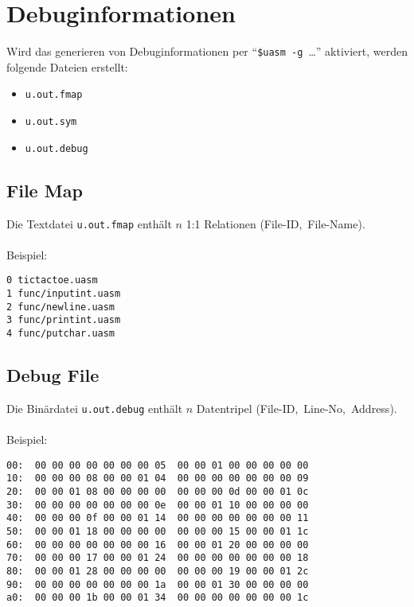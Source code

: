 \section{Debuginformationen}

\begin{frame}{\insertsection}
    Wird das generieren von Debuginformationen per ``\texttt{\$uasm~-g}~\ldots''
    aktiviert, werden folgende Dateien erstellt:
    \begin{itemize}
        \item \texttt{u.out.fmap}
        \item \texttt{u.out.sym}
        \item \texttt{u.out.debug}
    \end{itemize}
\end{frame}

\subsection{File Map}

\begin{frame}[fragile]{\insertsubsection}
    Die Textdatei \texttt{u.out.fmap} enthält $n$ 1:1 Relationen (File-ID,~File-Name).
    \\~\\
    Beispiel:
\begin{verbatim}
0 tictactoe.uasm
1 func/inputint.uasm
2 func/newline.uasm
3 func/printint.uasm
4 func/putchar.uasm
\end{verbatim}
\end{frame}

\subsection{Debug File}

\begin{frame}[fragile]{\insertsubsection}
    Die Binärdatei \texttt{u.out.debug} enthält $n$ Datentripel (File-ID,~Line-No,~Address).
    \\~\\
    Beispiel:
\begin{verbatim}
00:  00 00 00 00 00 00 00 05  00 00 01 00 00 00 00 00
10:  00 00 00 08 00 00 01 04  00 00 00 00 00 00 00 09
20:  00 00 01 08 00 00 00 00  00 00 00 0d 00 00 01 0c
30:  00 00 00 00 00 00 00 0e  00 00 01 10 00 00 00 00
40:  00 00 00 0f 00 00 01 14  00 00 00 00 00 00 00 11
50:  00 00 01 18 00 00 00 00  00 00 00 15 00 00 01 1c
60:  00 00 00 00 00 00 00 16  00 00 01 20 00 00 00 00
70:  00 00 00 17 00 00 01 24  00 00 00 00 00 00 00 18
80:  00 00 01 28 00 00 00 00  00 00 00 19 00 00 01 2c
90:  00 00 00 00 00 00 00 1a  00 00 01 30 00 00 00 00
a0:  00 00 00 1b 00 00 01 34  00 00 00 00 00 00 00 1c
\end{verbatim}
\end{frame}

